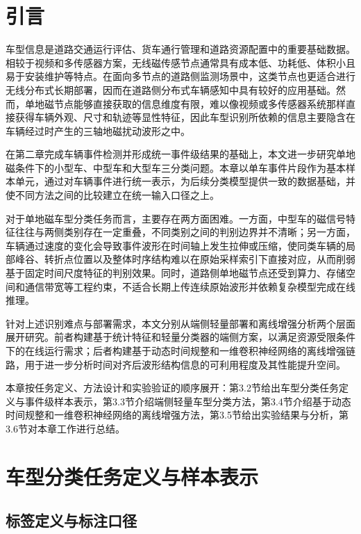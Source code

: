 \documentclass{xdupgthesis}
\begin{document}
\section{引言}
\label{sec:ch3_intro}

车型信息是道路交通运行评估、货车通行管理和道路资源配置中的重要基础数据。相较于视频和多传感器方案，无线磁传感节点通常具有成本低、功耗低、体积小且易于安装维护等特点\cite{ch2_sifuentes2011wakeup}。在面向多节点的道路侧监测场景中，这类节点也更适合进行无线分布式长期部署\cite{R09}，因而在道路侧分布式车辆感知中具有较好的应用基础。然而，单地磁节点能够直接获取的信息维度有限，难以像视频或多传感器系统那样直接获得车辆外观、尺寸和轨迹等显性特征，因此车型识别所依赖的信息主要隐含在车辆经过时产生的三轴地磁扰动波形之中。

在第二章完成车辆事件检测并形成统一事件级结果的基础上，本文进一步研究单地磁条件下的小型车、中型车和大型车三分类问题。本章以单车事件片段作为基本样本单元，通过对车辆事件进行统一表示，为后续分类模型提供一致的数据基础，并使不同方法之间的比较建立在统一输入口径之上。

对于单地磁车型分类任务而言，主要存在两方面困难。一方面，中型车的磁信号特征往往与两侧类别存在一定重叠，不同类别之间的判别边界并不清晰；另一方面，车辆通过速度的变化会导致事件波形在时间轴上发生拉伸或压缩，使同类车辆的局部峰谷、转折点位置以及整体时序结构难以在原始采样索引下直接对应，从而削弱基于固定时间尺度特征的判别效果。同时，道路侧单地磁节点还受到算力、存储空间和通信带宽等工程约束，不适合长期上传连续原始波形并依赖复杂模型完成在线推理。

针对上述识别难点与部署需求，本文分别从端侧轻量部署和离线增强分析两个层面展开研究。前者构建基于统计特征和轻量分类器的端侧方案，以满足资源受限条件下的在线运行需求；后者构建基于动态时间规整和一维卷积神经网络的离线增强链路，用于进一步分析时间对齐后波形结构信息的可利用程度及其性能提升空间。

本章按任务定义、方法设计和实验验证的顺序展开：第3.2节给出车型分类任务定义与事件级样本表示，第3.3节介绍端侧轻量车型分类方法，第3.4节介绍基于动态时间规整和一维卷积神经网络的离线增强方法，第3.5节给出实验结果与分析，第3.6节对本章工作进行总结。

\section{车型分类任务定义与样本表示}
\label{sec:ch3_task_data}

\subsection{标签定义与标注口径}
\label{subsec:ch3_data_build}
\end{document}
